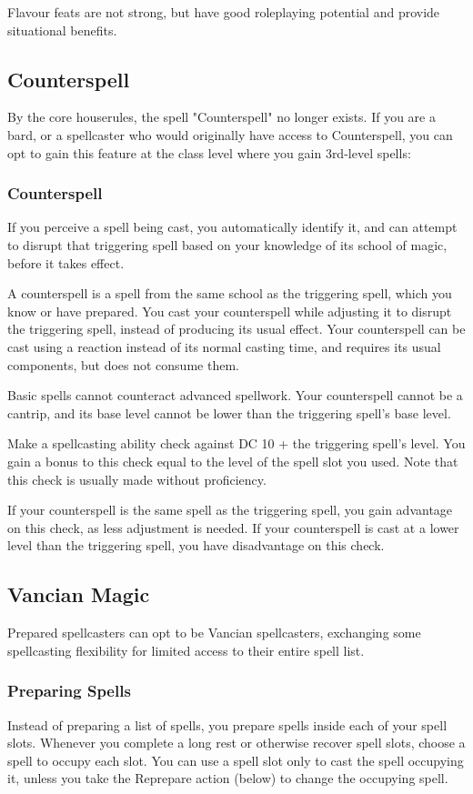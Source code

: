 \documentclass[letterpaper,twocolumn,openany,nodeprecatedcode,bg=print]{dndbook}
\begin{document}
Flavour feats are not strong, but have good roleplaying potential and provide situational benefits.

\subsection{Counterspell}
\label{counterspell}
By the core houserules, the spell "Counterspell" no longer exists. 
If you are a bard, or a spellcaster who would originally have access to Counterspell, 
you can opt to gain this feature at the class level where you gain 3rd-level spells:

\subsubsection{Counterspell}
If you perceive a spell being cast, 
you automatically identify it, 
and can attempt to disrupt that triggering spell based on your knowledge of its school of magic, before it takes effect.

A counterspell is a spell from the same school as the triggering spell, which you know or have prepared. 
You cast your counterspell while adjusting it to disrupt the triggering spell, instead of producing its usual effect. 
Your counterspell can be cast using a reaction instead of its normal casting time, 
and requires its usual components, but does not consume them.

Basic spells cannot counteract advanced spellwork. 
Your counterspell cannot be a cantrip, 
and its base level cannot be lower than the triggering spell's base level.

Make a spellcasting ability check against DC 10 + the triggering spell's level. 
You gain a bonus to this check equal to the level of the spell slot you used. 
Note that this check is usually made without proficiency.

If your counterspell is the same spell as the triggering spell, you gain advantage on this check, as less adjustment is needed. 
If your counterspell is cast at a lower level than the triggering spell, you have disadvantage on this check.

\subsection{Vancian Magic}
Prepared spellcasters can opt to be Vancian spellcasters, 
exchanging some spellcasting flexibility for limited access to their entire spell list.

\subsubsection{Preparing Spells}
Instead of preparing a list of spells, you prepare spells inside each of your spell slots. 
Whenever you complete a long rest or otherwise recover spell slots, choose a spell to occupy each slot. 
You can use a spell slot only to cast the spell occupying it, unless you take the Reprepare action (below) to change the occupying spell.
\end{document}
